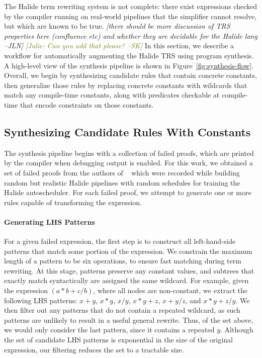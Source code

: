 \documentclass[sigplan,10pt,review,anonymous]{acmart}\settopmatter{printfolios=true,printccs=false,printacmref=false}
\newcommand{\jln}[1]{\textcolor{uwpurple}{\textit{[{#1} --JLN]}}}
\newcommand{\sak}[1]{\textcolor{olive}{\textit{[{#1} --SK]}}}
\begin{document}
The Halide term rewriting system is not complete: there
exist expressions checked by the compiler running on real-world pipelines that
the simplifier cannot resolve, but which are known to be true. \jln{there should
  be more discussion of TRS properties here (confluence etc) and whether they
  are decidable for the Halide lang} \sak{Julie: Can you add that please?}
In this section, we describe a workflow for automatically augmenting the Halide
TRS using program synthesis.
A high-level view of the synthesis pipeline is shown in Figure~\ref{fig:synthesis-flow}.
Overall, we begin by synthesizing candidate rules that contain concrete constants,
then generalize those rules by replacing concrete constants with wildcards that
match any compile-time constants, along with predicates checkable at compile-time
that encode constraints on those constants.

\subsection{Synthesizing Candidate Rules With Constants}
The synthesis pipeline begins with a collection of failed proofs, which are printed
by the compiler when debugging output is enabled.  For this work, we obtained a set
of failed proofs from the authors of \citeauthor{Adams2019}~\cite{Adams2019} which were recorded
while building random but realistic Halide pipelines with random schedules for
training the Halide autoscheduler.  For each failed proof, we attempt to generate
one or more rules capable of transforming the expression.


\paragraph{Generating LHS Patterns} For a given failed expression, the first step
is to construct all left-hand-side patterns that match some portion of the expression.
We constrain the maximum length of a pattern to be six operations, to ensure fast matching
during term rewriting. At this stage, patterns preserve any constant values, and subtrees
that exactly match syntactically are assigned the same wildcard. For
example, given the expression $(a*b + c/b)$, where all nodes are non-constant,
we extract the following LHS patterns: $x + y$, $x * y$, $x / y$, $x * y + z$,
$x + y/z$, and $x*y + z/y$.  We then filter out any patterns that do not contain
a repeated wildcard, as such patterns are unlikely to result in a useful general
rewrite.  Thus, of the set above, we would only consider the last pattern, since
it contains a repeated $y$.  Although the set of candidate LHS patterns is exponential
in the size of the original expression, our filtering reduces the set to a tractable
size.
\end{document}

